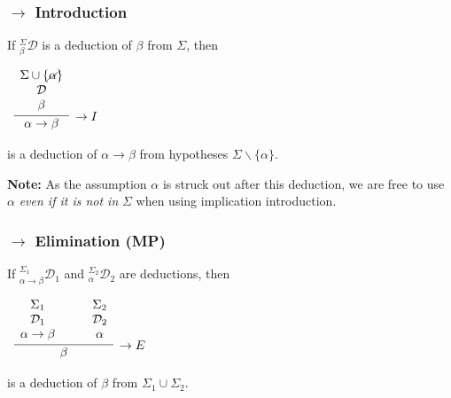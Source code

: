 \documentclass{beamer}
\theoremstyle{indentDefn} \newtheorem{defn}[]{Definition}
\begin{document}
\begin{frame}
  \frametitle{$\rightarrow$ Introduction}

	If $^{\Sigma}_{\beta}\mathcal{D}$ is a deduction of $\beta$ from $\Sigma$, then

	\begin{center}		
		$\begin{array}{c}		
			\infer[\rightarrow I]{\alpha \rightarrow \beta}
				{\begin{array}{c} \Sigma \cup \{\cancel{\alpha}\} \\ \mathcal{D} \\ \beta \end{array}}
		\end{array}$
	\end{center}

	is a deduction of $\alpha \rightarrow \beta$ from hypotheses $\Sigma \backslash \{\alpha\}$.
	
	\vspace{1.5cm} 
	
	{\bf Note: }As the assumption $\alpha$ is struck out after this deduction, we are free to use $\alpha$ \emph{even if it is not in} $\Sigma$ when using implication introduction. 

\end{frame}

\begin{frame}
	\frametitle{$\rightarrow$ Elimination (MP)}
	
	If $^{\Sigma_{1}}_{\alpha \rightarrow \beta}\mathcal{D}_{1}$ and $^{\Sigma_{2}}_{\alpha}\mathcal{D}_{2}$ are deductions, then
	
	\vspace{0.5cm}
	
	\begin{center}
		$\begin{array}{c}		
			\infer[\rightarrow E]{\beta}{\begin{array}{c} \Sigma_{1} \\ \mathcal{D}_{1} \\ \alpha \rightarrow \beta \end{array} \quad & \begin{array}{c} \Sigma_{2} \\ \mathcal{D}_{2} \\ \alpha \end{array}}	
		\end{array}$
	\end{center}
	
	is a deduction of $\beta$ from $\Sigma_{1} \cup \Sigma_{2}$.
\end{frame}
\end{document}
